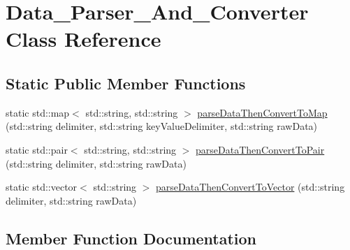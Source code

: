 \hypertarget{class_data___parser___and___converter}{}\section{Data\+\_\+\+Parser\+\_\+\+And\+\_\+\+Converter Class Reference}
\label{class_data___parser___and___converter}
\subsection*{Static Public Member Functions}
\begin{DoxyCompactItemize}
\item 
static std\+::map$<$ std\+::string, std\+::string $>$ \mbox{\hyperlink{class_data___parser___and___converter_a42e1a74db4715d980b83f42d103c25e2}{parse\+Data\+Then\+Convert\+To\+Map}} (std\+::string delimiter, std\+::string key\+Value\+Delimiter, std\+::string raw\+Data)
\item 
static std\+::pair$<$ std\+::string, std\+::string $>$ \mbox{\hyperlink{class_data___parser___and___converter_af44ead8fe2769d136227e3f603d14f70}{parse\+Data\+Then\+Convert\+To\+Pair}} (std\+::string delimiter, std\+::string raw\+Data)
\item 
static std\+::vector$<$ std\+::string $>$ \mbox{\hyperlink{class_data___parser___and___converter_aba2bbb38e79306b1da28ec1042e2b888}{parse\+Data\+Then\+Convert\+To\+Vector}} (std\+::string delimiter, std\+::string raw\+Data)
\end{DoxyCompactItemize}


\subsection{Member Function Documentation}
\mbox{\label{class_data___parser___and___converter_a42e1a74db4715d980b83f42d103c25e2}} 
